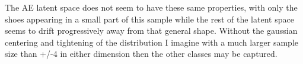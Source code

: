 \documentclass[sigconf]{acmart}
\begin{document}
The AE latent space does not seem to have these same properties, with only the shoes appearing in a small part of this sample while the rest of the latent space seems to drift progressively away from that general shape. Without the gaussian centering and tightening of the distribution I imagine with a much larger sample size than +/-4 in either dimension then the other classes may be captured.
\end{document}
